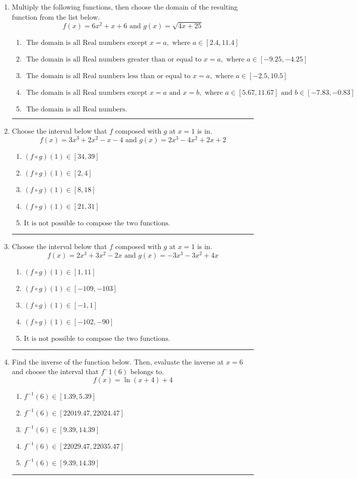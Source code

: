 \documentclass[14pt]{extbook}
\newcommand{\litem}[1]{\item#1\hspace*{-1cm}\rule{\textwidth}{0.4pt}}
\begin{document}
\begin{enumerate}
\litem{
Multiply the following functions, then choose the domain of the resulting function from the list below.\[ f(x) = 6x^{2} +x + 6 \text{ and } g(x) = \sqrt{4x+25}  \]\begin{enumerate}[label=\Alph*.]
\item \( \text{ The domain is all Real numbers except } x = a, \text{ where } a \in [2.4, 11.4] \)
\item \( \text{ The domain is all Real numbers greater than or equal to } x = a, \text{ where } a \in [-9.25, -4.25] \)
\item \( \text{ The domain is all Real numbers less than or equal to } x = a, \text{ where } a \in [-2.5, 10.5] \)
\item \( \text{ The domain is all Real numbers except } x = a \text{ and } x = b, \text{ where } a \in [5.67, 11.67] \text{ and } b \in [-7.83, -0.83] \)
\item \( \text{ The domain is all Real numbers. } \)

\end{enumerate} }
\litem{
Choose the interval below that $f$ composed with $g$ at $x=1$ is in.\[ f(x) = 3x^{3} +2 x^{2} -x -4 \text{ and } g(x) = 2x^{3} -4 x^{2} +2 x + 2 \]\begin{enumerate}[label=\Alph*.]
\item \( (f \circ g)(1) \in [34, 39] \)
\item \( (f \circ g)(1) \in [2, 4] \)
\item \( (f \circ g)(1) \in [8, 18] \)
\item \( (f \circ g)(1) \in [21, 31] \)
\item \( \text{It is not possible to compose the two functions.} \)

\end{enumerate} }
\litem{
Choose the interval below that $f$ composed with $g$ at $x=1$ is in.\[ f(x) = 2x^{3} +3 x^{2} -2 x \text{ and } g(x) = -3x^{3} -3 x^{2} +4 x \]\begin{enumerate}[label=\Alph*.]
\item \( (f \circ g)(1) \in [1, 11] \)
\item \( (f \circ g)(1) \in [-109, -103] \)
\item \( (f \circ g)(1) \in [-1, 1] \)
\item \( (f \circ g)(1) \in [-102, -90] \)
\item \( \text{It is not possible to compose the two functions.} \)

\end{enumerate} }
\litem{
Find the inverse of the function below. Then, evaluate the inverse at $x = 6$ and choose the interval that $f^-1(6)$ belongs to.\[ f(x) = \ln{(x+4)}+4 \]\begin{enumerate}[label=\Alph*.]
\item \( f^{-1}(6) \in [1.39, 5.39] \)
\item \( f^{-1}(6) \in [22019.47, 22024.47] \)
\item \( f^{-1}(6) \in [9.39, 14.39] \)
\item \( f^{-1}(6) \in [22029.47, 22035.47] \)
\item \( f^{-1}(6) \in [9.39, 14.39] \)


\end{enumerate}}
\end{enumerate}
\end{document}
